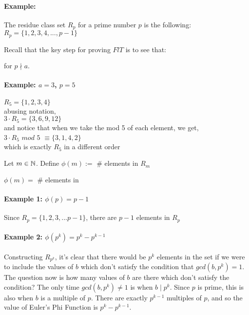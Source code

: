 \documentclass[main.tex]{subfiles}
\begin{document}
\paragraph{Example:}
\begin{center}
    The residue class set $R_p$ for a prime number $p$ is the following: \\
    $R_p = \{1,2,3,4, ... , p-1\}$
\end{center}
Recall that the key step for proving $FlT$ is to see that: \\
\centerline{ for $p \nmid a$.}

\paragraph{Example: $a=3$, $p=5$}
\begin{center}
    $R_5=\{1,2,3,4\}$ \\
    abusing notation, \\
    $3 \cdot R_5 = \{3,6,9,12\}$ \\
    and notice that when we take the mod 5 of each element, we get, \\
    $3 \cdot R_5$ $mod$ $5$ $\equiv \{3,1,4,2\}$ \\
    which is exactly $R_5$ in a different order
\end{center}

\begin{defn}
    Let $m \in \mathbb{N}$. Define $\phi(m):=$ \# elements in $R_m$ \\
    \centerline{$\phi(m)=$ \# elements in }
\end{defn}

\paragraph{Example 1: $\phi(p)=p-1$ \\}
Since $R_p=\{1,2,3,...p-1\}$, there are $p-1$ elements in $R_p$

\paragraph{Example 2: $\phi(p^k)=p^k-p^{k-1}$ \\}
Constructing $R_{p^k}$, it's clear that there would be $p^k$ elements in the set if we were to include the values of $b$ which don't satisfy the condition that $gcd(b,p^k)=1$. The question now is how many values of $b$ are there which don't satisfy the condition? The only time $gcd(b,p^k) \neq 1$ is when $b \mid p^k$. Since $p$ is prime, this is also when $b$ is a multiple of $p$. There are exactly $p^{k-1}$ multiples of $p$, and so the value of Euler's Phi Function is $p^k - p^{k-1}$.
\end{document}
